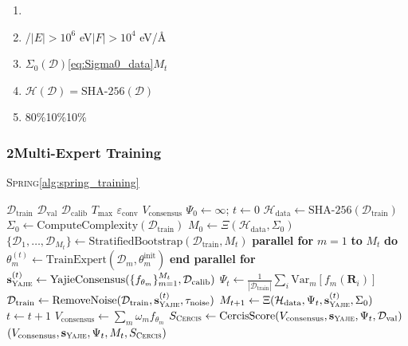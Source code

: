 \documentclass[12pt,a4paper]{article}
\theoremstyle{remark}
\newcommand{\Var}{\mathrm{Var}}
\newcommand{\D}{\mathcal{D}}
\newcommand{\Spring}{\textsc{Spring}}
\newcommand{\Yajie}{\textsc{Yajie}}
\newcommand{\Cercis}{\textsc{Cercis}}
\newcommand{\Lyap}{\ensuremath{\Psi}}
\newcommand{\Dhash}{\ensuremath{\mathcal{H}(\D)}}
\begin{document}
\begin{enumerate}[label=(\arabic*),nosep]
    \item 
    \item /$|E| > 10^6$ eV$|F| > 10^4$ eV/Å
    \item $\Sigma_0(\D)$\eqref{eq:Sigma0_data}$M_t$
    \item $\Dhash = \text{SHA-256}(\D)$
    \item 80\%10\%10\%
\end{enumerate}

\subsubsection*{2Multi-Expert Training}

\Spring{}\ref{alg:spring_training}

\begin{algorithm}[H]
\caption{Spring}
\label{alg:spring_training}
\begin{algorithmic}[1]
\Require  $\D_{\text{train}}$ $\D_{\text{val}}$ $\D_{\text{calib}}$
\Require  $T_{\text{max}}$ $\varepsilon_{\text{conv}}$
\Ensure  $V_{\text{consensus}}$
\State $\Lyap_0 \gets \infty$; $t \gets 0$
\State $\mathcal{H}_{\text{data}} \gets \text{SHA-256}(\D_{\text{train}})$
\State $\Sigma_0 \gets \text{ComputeComplexity}(\D_{\text{train}})$ \Comment{}
\State $M_0 \gets \Xi(\mathcal{H}_{\text{data}}, \Sigma_0)$ 
\While{$t < T_{\text{max}}$ \textbf{and} $\Lyap_t > \varepsilon_{\text{conv}}$}
    \State $\{\D_1, \ldots, \D_{M_t}\} \gets \text{StratifiedBootstrap}(\D_{\text{train}}, M_t)$
    \State \textbf{parallel for} $m = 1$ \textbf{to} $M_t$ \textbf{do}
        \State $\theta_m^{(t)} \gets \text{TrainExpert}(\D_m, \theta_m^{\text{init}})$
            \Comment{}
    \State \textbf{end parallel for}
    \State $\mathbf{s}_{\Yajie}^{(t)} \gets \text{YajieConsensus}(\{f_{\theta_m}\}_{m=1}^{M_t}, \D_{\text{calib}})$
    \State $\Lyap_t \gets \frac{1}{|\D_{\text{train}}|}\sum_{i}\Var_m[f_m(\mathbf{R}_i)]$
    \State $\D_{\text{train}} \gets \text{RemoveNoise}(\D_{\text{train}}, \mathbf{s}_{\Yajie}^{(t)}, \tau_{\text{noise}})$
    \State $M_{t+1} \gets \Xi(\mathcal{H}_{\text{data}}, \Lyap_t, \mathbf{s}_{\Yajie}^{(t)}, \Sigma_0)$
    \State $t \gets t + 1$
\EndWhile
\State $V_{\text{consensus}} \gets \sum_{m} \omega_m f_{\theta_m}$ \Comment{}
\State $S_{\Cercis} \gets \text{CercisScore}(V_{\text{consensus}}, \mathbf{s}_{\Yajie}, \Lyap_t, \D_{\text{val}})$
\State \Return $(V_{\text{consensus}}, \mathbf{s}_{\Yajie}, \Lyap_t, M_t, S_{\Cercis})$
\end{algorithmic}
\end{algorithm}
\end{document}

